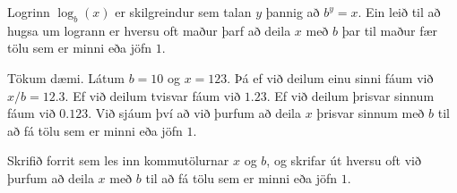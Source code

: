 
Logrinn $\log_b(x)$ er skilgreindur sem talan $y$ þannig að $b^y = x$. Ein leið
til að hugsa um logrann er hversu oft maður þarf að deila $x$ með $b$ þar til
maður fær tölu sem er minni eða jöfn $1$.

Tökum dæmi. Látum $b = 10$ og $x = 123$. Þá ef við deilum einu sinni fáum við
$x/b = 12.3$. Ef við deilum tvisvar fáum við $1.23$. Ef við deilum þrisvar
sinnum fáum við $0.123$. Við sjáum því að við þurfum að deila $x$ þrisvar
sinnum með $b$ til að fá tölu sem er minni eða jöfn $1$.

Skrifið forrit sem les inn kommutölurnar $x$ og $b$, og skrifar út hversu oft
við þurfum að deila $x$ með $b$ til að fá tölu sem er minni eða jöfn $1$.

